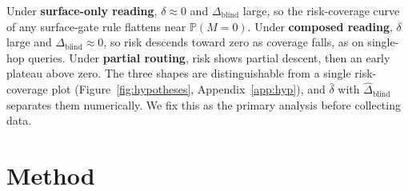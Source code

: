 \documentclass{article}
\begin{document}
Under \textbf{surface-only reading}, $\delta\approx0$ and $\Delta_{\mathrm{blind}}$ large, so the
risk-coverage curve of any surface-gate rule flattens near $\mathbb{P}(M=0)$. Under \textbf{composed
reading}, $\delta$ large and $\Delta_{\mathrm{blind}}\approx0$, so risk descends toward zero as
coverage falls, as on single-hop queries. Under \textbf{partial routing}, risk shows partial descent,
then an early plateau above zero. The three shapes are distinguishable from a single risk-coverage
plot (Figure~\ref{fig:hypotheses}, Appendix~\ref{app:hyp}), and $\hat\delta$ with
$\hat\Delta_{\mathrm{blind}}$ separates them numerically. We fix this as the primary analysis before
collecting data.


\section{Method}
\end{document}
